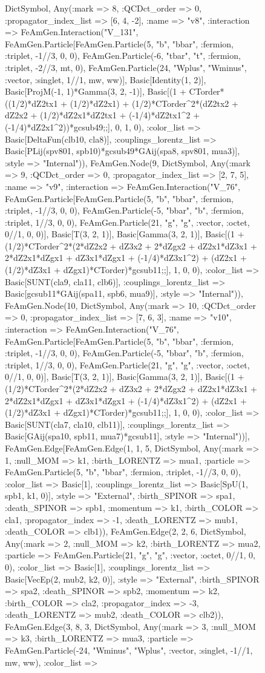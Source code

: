 \documentclass{revtex4}
\begin{document}
\begin{figure}[!htb]
\begin{center}
{Dict{Symbol, Any}(:mark => 8, :QCDct_order => 0, :propagator_index_list => [6, 4, -2], :name => "v8", :interaction => FeAmGen.Interaction("V_131", FeAmGen.Particle[FeAmGen.Particle(5, "b", "bbar", :fermion, :triplet, -1//3, 0, 0), FeAmGen.Particle(-6, "tbar", "t", :fermion, :triplet, -2//3, mt, 0), FeAmGen.Particle(24, "Wplus", "Wminus", :vector, :singlet, 1//1, mw, ww)], Basic[Identity(1, 2)], Basic[ProjM(-1, 1)*Gamma(3, 2, -1)], Basic[(1 + CTorder*((1/2)*dZ2tx1 + (1/2)*dZ2x1) + (1/2)*CTorder^2*(dZ2tx2 + dZ2x2 + (1/2)*dZ2x1*dZ2tx1 + (-1/4)*dZ2tx1^2 + (-1/4)*dZ2x1^2))*gcsub49;;], 0, 1, 0), :color_list => Basic[DeltaFun(clb10, cla8)], :couplings_lorentz_list => Basic[PLij(spv801, spb10)*gcsub49*GAij(spa8, spv801, mua3)], :style => "Internal")), FeAmGen.Node(9, Dict{Symbol, Any}(:mark => 9, :QCDct_order => 0, :propagator_index_list => [2, 7, 5], :name => "v9", :interaction => FeAmGen.Interaction("V_76", FeAmGen.Particle[FeAmGen.Particle(5, "b", "bbar", :fermion, :triplet, -1//3, 0, 0), FeAmGen.Particle(-5, "bbar", "b", :fermion, :triplet, 1//3, 0, 0), FeAmGen.Particle(21, "g", "g", :vector, :octet, 0//1, 0, 0)], Basic[T(3, 2, 1)], Basic[Gamma(3, 2, 1)], Basic[(1 + (1/2)*CTorder^2*(2*dZ2x2 + dZ3x2 + 2*dZgx2 + dZ2x1*dZ3x1 + 2*dZ2x1*dZgx1 + dZ3x1*dZgx1 + (-1/4)*dZ3x1^2) + (dZ2x1 + (1/2)*dZ3x1 + dZgx1)*CTorder)*gcsub11;;], 1, 0, 0), :color_list => Basic[SUNT(cla9, cla11, clb6)], :couplings_lorentz_list => Basic[gcsub11*GAij(spa11, spb6, mua9)], :style => "Internal")), FeAmGen.Node(10, Dict{Symbol, Any}(:mark => 10, :QCDct_order => 0, :propagator_index_list => [7, 6, 3], :name => "v10", :interaction => FeAmGen.Interaction("V_76", FeAmGen.Particle[FeAmGen.Particle(5, "b", "bbar", :fermion, :triplet, -1//3, 0, 0), FeAmGen.Particle(-5, "bbar", "b", :fermion, :triplet, 1//3, 0, 0), FeAmGen.Particle(21, "g", "g", :vector, :octet, 0//1, 0, 0)], Basic[T(3, 2, 1)], Basic[Gamma(3, 2, 1)], Basic[(1 + (1/2)*CTorder^2*(2*dZ2x2 + dZ3x2 + 2*dZgx2 + dZ2x1*dZ3x1 + 2*dZ2x1*dZgx1 + dZ3x1*dZgx1 + (-1/4)*dZ3x1^2) + (dZ2x1 + (1/2)*dZ3x1 + dZgx1)*CTorder)*gcsub11;;], 1, 0, 0), :color_list => Basic[SUNT(cla7, cla10, clb11)], :couplings_lorentz_list => Basic[GAij(spa10, spb11, mua7)*gcsub11], :style => "Internal"))], FeAmGen.Edge[FeAmGen.Edge(1, 1, 5, Dict{Symbol, Any}(:mark => 1, :null_MOM => k1, :birth_LORENTZ => mua1, :particle => FeAmGen.Particle(5, "b", "bbar", :fermion, :triplet, -1//3, 0, 0), :color_list => Basic[1], :couplings_lorentz_list => Basic[SpU(1, spb1, k1, 0)], :style => "External", :birth_SPINOR => spa1, :death_SPINOR => spb1, :momentum => k1, :birth_COLOR => cla1, :propagator_index => -1, :death_LORENTZ => mub1, :death_COLOR => clb1)), FeAmGen.Edge(2, 2, 6, Dict{Symbol, Any}(:mark => 2, :null_MOM => k2, :birth_LORENTZ => mua2, :particle => FeAmGen.Particle(21, "g", "g", :vector, :octet, 0//1, 0, 0), :color_list => Basic[1], :couplings_lorentz_list => Basic[VecEp(2, mub2, k2, 0)], :style => "External", :birth_SPINOR => spa2, :death_SPINOR => spb2, :momentum => k2, :birth_COLOR => cla2, :propagator_index => -3, :death_LORENTZ => mub2, :death_COLOR => clb2)), FeAmGen.Edge(3, 8, 3, Dict{Symbol, Any}(:mark => 3, :null_MOM => k3, :birth_LORENTZ => mua3, :particle => FeAmGen.Particle(-24, "Wminus", "Wplus", :vector, :singlet, -1//1, mw, ww), :color_list => }
\end{center}
\end{figure}
\end{document}
